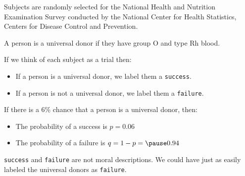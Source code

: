 \documentclass{beamer}
\begin{document}
\begin{frame}
  \begin{example}\label{universal donor}
    \vspace{-2mm}
    Subjects are randomly selected for the National Health and Nutrition Examination Survey conducted by the National Center for Health Statistics, Centers for Disease Control and Prevention.\pause
    
    \vspace{1mm}
    A person is a universal donor if they have group O and type Rh blood.\pause
    
    \vspace{1mm}
    If we think of each subject as a trial then:\pause
    \begin{itemize}
    \item If a person is a universal donor, we label them a \texttt{success}.\pause
    \item If a person is not a universal donor, we label them a \texttt{failure}.
    \end{itemize}\pause

    If there is a 6\% chance that a person is a universal donor, then:\pause
    \begin{itemize}
    \item The probability of a success is $p=0.06$\pause
    \item The probability of a failure is $q=1-p=\pause 0.94$
    \end{itemize}
  \end{example}\pause

  \begin{note}
    \texttt{success} and \texttt{failure} are not moral descriptions. We could have just as easily labeled the universal donors as \texttt{failure}.
  \end{note}
\end{frame}
\end{document}
